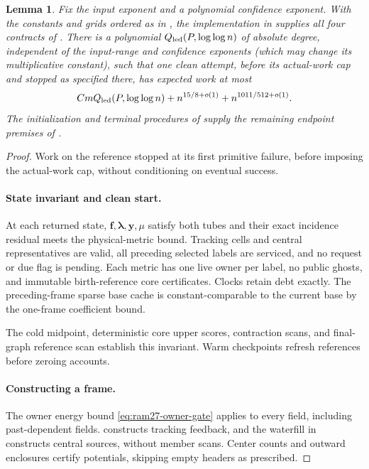 \documentclass[11pt]{article}
\newtheorem{lemma}[theorem]{Lemma}
\theoremstyle{remark}
\newcommand{\ff}{\mathbf f}
\newcommand{\llambda}{\boldsymbol{\lambda}}
\newcommand{\yy}{\mathbf y}
\begin{document}
\begin{lemma}
\label{prop:ram27-contract-closure}
Fix the input exponent and a polynomial confidence exponent.
With the constants and grids ordered as in , the
implementation in  supplies all four contracts of
.
There is a polynomial $Q_{\rm led}(P,\log\log n)$ of absolute degree, independent of the
input-range and confidence exponents (which may change its multiplicative
constant), such that one clean attempt, before its actual-work cap and stopped
as specified there, has expected work at most
\[
 C mQ_{\rm led}(P,\log\log n)+n^{15/8+o(1)}
                         +n^{1011/512+o(1)}.
\]
The initialization and terminal procedures of  supply
the remaining endpoint premises of .
\end{lemma} \begin{proof} Work on the reference stopped at its first primitive
failure, before imposing the actual-work cap, without conditioning on eventual
success.

\paragraph{State invariant and clean start.}
At each returned state, $\ff,\llambda,\yy,\mu$ satisfy both tubes and their exact
incidence residual meets the physical-metric bound.
Tracking cells and central representatives are valid, all preceding selected
labels are serviced, and no request or due flag is pending.
Each metric has one live owner per label, no public ghosts, and immutable
birth-reference core certificates.
Clocks retain debt exactly.
The preceding-frame sparse base cache is constant-comparable to the current base
by the one-frame coefficient bound.

The cold midpoint, deterministic core upper scores, contraction scans, and
final-graph reference scan establish this invariant.
Warm checkpoints refresh references before zeroing accounts.

\paragraph{Constructing a frame.}
The owner energy bound \eqref{eq:ram27-owner-gate} applies to every field,
including past-dependent fields.
 constructs tracking feedback, and the waterfill in
 constructs central sources, without member scans.
Center counts and outward enclosures certify potentials, skipping empty headers
as prescribed.


\end{proof}
\end{document}
